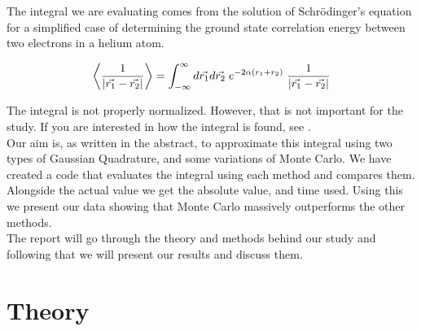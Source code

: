 \documentclass{article}
\begin{document}
The integral we are evaluating comes from the solution of Schrödinger's equation for a simplified case of determining the ground state correlation energy between two electrons in a helium atom.

\begin{equation} \label{eq:integral}
    \left\langle \frac{1}{| \vec{r_1} - \vec{r_2} |} \right\rangle = \int_{-\infty} ^\infty d \vec{r_1} d \vec{r_2} \hspace{1mm} e^{- 2 \alpha (r_1 + r_2)} \hspace{1mm} \frac{1}{| \vec{r_1} - \vec{r_2} |}
\end{equation}

The integral is not properly normalized. However, that is not important for the study.
If you are interested in how the integral is found, see \cite{task}.\\
Our aim is, as written in the abstract, to approximate this integral using two types of Gaussian Quadrature, and some variations of Monte Carlo. We have created a code that evaluates the integral using each method and compares them. Alongside the actual value we get the absolute value, and time used. Using this we present our data showing that Monte Carlo massively outperforms the other methods.\\
The report will go through the theory and methods behind our study and following that we will present our results and discuss them.

\vspace{1cm}

\section{Theory} \label{sec:Theory}
\end{document}
